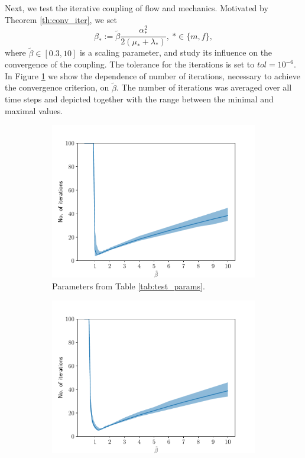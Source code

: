 \documentclass[a4paper]{article}
\numberwithin{equation}{section}
\newcommand{\eq}[1]{\begin{equation}#1\end{equation}}
\begin{document}
Next, we test the iterative coupling of flow and mechanics.
Motivated by Theorem \ref{th:conv_iter}, we set
\eq{ \beta_*:=\tilde\beta\frac{\alpha_*^2}{2(\mu_*+\lambda_*)}, ~*\in\{m,f\}, }
where $\tilde\beta\in[0.3,10]$ is a scaling parameter, and study its influence on the convergence of the coupling.
The tolerance for the iterations is set to $tol=10^{-6}$.
In Figure \ref{fig:test_iterations_table} we show the dependence of number of iterations, necessary to achieve the convergence criterion, on $\tilde\beta$.
The number of iterations was averaged over all time steps and depicted together with the range between the minimal and maximal values.
\begin{figure}
\centering
\begin{subfigure}[b]{0.49\textwidth}
\centering
\includegraphics[width=\textwidth]{figures/conv_result_linear_dt_100_alpha_1_cond_9p81e-18_Er_6e+10_Ef_1e+06_nur_0_nuf_0.pdf}
\caption{Parameters from Table \ref{tab:test_params}.}
\label{fig:test_iterations_table}
\end{subfigure}
\begin{subfigure}[b]{0.49\textwidth}
\centering
\includegraphics[width=\textwidth]{figures/conv_result_linear_dt_100_alpha_1_cond_9p81e-11_Er_6e+10_Ef_1e+06_nur_0_nuf_0.pdf}

\end{subfigure}
\end{figure}
\end{document}
